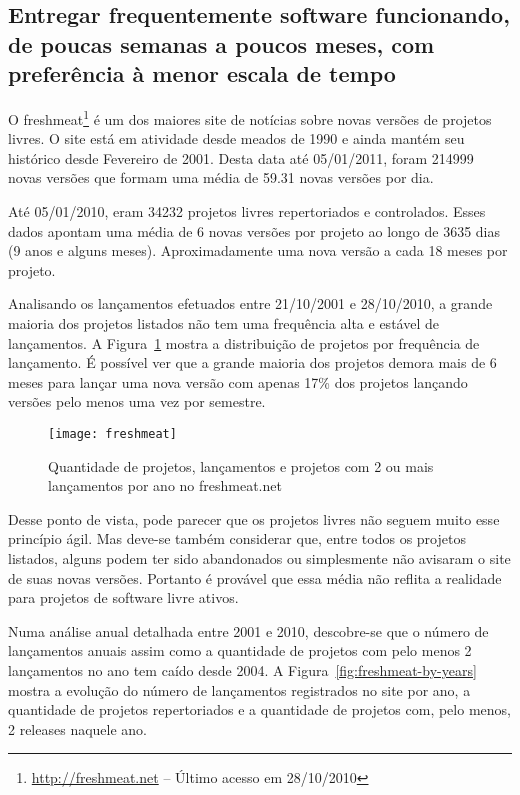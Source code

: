\subsection[Entregas frequentes]{Entregar frequentemente software
  funcionando, de poucas semanas a poucos meses, com preferência à
  menor escala de tempo}

O freshmeat\footnote{\url{http://freshmeat.net} -- Último acesso em
  28/10/2010} é um dos maiores site de notícias sobre novas versões de
projetos livres. O site está em atividade desde meados de 1990 e ainda
mantém seu histórico desde Fevereiro de 2001. Desta data até
05/01/2011, foram 214999 novas versões que formam uma média de 59.31
novas versões por dia.

Até 05/01/2010, eram 34232 projetos livres repertoriados e
controlados. Esses dados apontam uma média de 6 novas versões por
projeto ao longo de 3635 dias (9 anos e alguns meses).
Aproximadamente uma nova versão a cada 18 meses por projeto.

Analisando os lançamentos efetuados entre 21/10/2001 e 28/10/2010, a
grande maioria dos projetos listados não tem uma frequência alta e
estável de lançamentos. A Figura~\ref{fig:freshmeat} mostra a
distribuição de projetos por frequência de lançamento. É possível ver
que a grande maioria dos projetos demora mais de 6 meses para lançar
uma nova versão com apenas 17\% dos projetos lançando versões pelo
menos uma vez por semestre.


\begin{figure}[htb]
  \centering
  \texttt{[image: freshmeat]}
  \caption{Quantidade de projetos, lançamentos e projetos com 2 ou
    mais lançamentos por ano no freshmeat.net}
  \label{fig:freshmeat}
\end{figure}

Desse ponto de vista, pode parecer que os projetos livres não seguem
muito esse princípio ágil. Mas deve-se também considerar que, entre
todos os projetos listados, alguns podem ter sido abandonados ou
simplesmente não avisaram o site de suas novas versões. Portanto é
provável que essa média não reflita a realidade para projetos de
software livre ativos.

Numa análise anual detalhada entre 2001 e 2010, descobre-se que o
número de lançamentos anuais assim como a quantidade de projetos com
pelo menos 2 lançamentos no ano tem caído desde 2004. A
Figura~\ref{fig:freshmeat-by-years} mostra a evolução do número de
lançamentos registrados no site por ano, a quantidade de projetos
repertoriados e a quantidade de projetos com, pelo menos, 2 releases
naquele ano.

